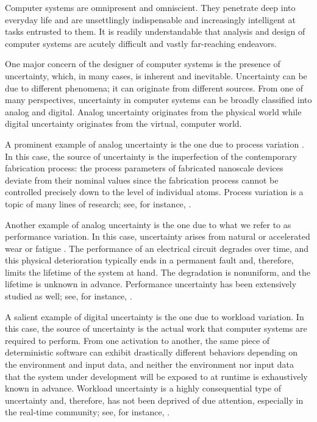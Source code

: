 Computer systems are omnipresent and omniscient. They penetrate deep into
everyday life and are unsettlingly indispensable and increasingly intelligent at
tasks entrusted to them. It is readily understandable that analysis and design
of computer systems are acutely difficult and vastly far-reaching endeavors.

One major concern of the designer of computer systems is the presence of
uncertainty, which, in many cases, is inherent and inevitable. Uncertainty can
be due to different phenomena; it can originate from different sources. From one
of many perspectives, uncertainty in computer systems can be broadly classified
into analog and digital. Analog uncertainty originates from the physical world
while digital uncertainty originates from the virtual, computer world.

A prominent example of analog uncertainty is the one due to process variation
\cite{srivastava2010}. In this case, the source of uncertainty is the
imperfection of the contemporary fabrication process: the process parameters of
fabricated nanoscale devices deviate from their nominal values since the
fabrication process cannot be controlled precisely down to the level of
individual atoms. Process variation is a topic of many lines of research; see,
for instance, \cite{bhardwaj2006, bhardwaj2008, chandra2010, juan2012, lee2013}.

Another example of analog uncertainty is the one due to what we refer to as
performance variation. In this case, uncertainty arises from natural or
accelerated wear or fatigue \cite{jedec2016}. The performance of an electrical
circuit degrades over time, and this physical deterioration typically ends in a
permanent fault and, therefore, limits the lifetime of the system at hand. The
degradation is nonuniform, and the lifetime is unknown in advance. Performance
uncertainty has been extensively studied as well; see, for instance,
\cite{coskun2006, huang2009b, das2014c}.

A salient example of digital uncertainty is the one due to workload variation.
In this case, the source of uncertainty is the actual work that computer systems
are required to perform. From one activation to another, the same piece of
deterministic software can exhibit drastically different behaviors depending on
the environment and input data, and neither the environment nor input data that
the system under development will be exposed to at runtime is exhaustively known
in advance. Workload uncertainty is a highly consequential type of uncertainty
and, therefore, has not been deprived of due attention, especially in the
real-time community; see, for instance, \cite{diaz2002, santinelli2011,
quinton2012, tanasa2015}.

